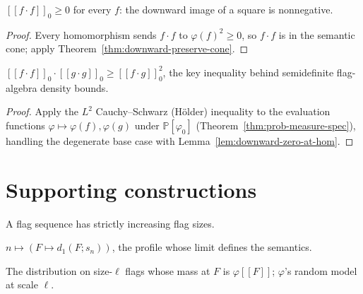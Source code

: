 \begin{theorem}
  \label{thm:square-downward-nonneg}
  \leanok
  $[\![f\cdot f]\!]_0 \ge 0$ for every $f$: the downward image of a square is
  nonnegative.
\end{theorem}
\begin{proof}\leanok
  Every homomorphism sends $f\cdot f$ to $\varphi(f)^2 \ge 0$, so $f\cdot f$ is in
  the semantic cone; apply Theorem~\ref{thm:downward-preserve-cone}.
\end{proof}

\begin{theorem}
  \label{thm:cauchy-schwarz}
  \leanok
  $[\![f\cdot f]\!]_0 \cdot [\![g\cdot g]\!]_0 \ge [\![f\cdot g]\!]_0^2$, the key
  inequality behind semidefinite flag-algebra density bounds.
\end{theorem}
\begin{proof}\leanok
  Apply the $L^2$ Cauchy--Schwarz (Hölder) inequality to the evaluation functions
  $\varphi \mapsto \varphi(f), \varphi(g)$ under $\mathbb{P}[\varphi_0]$
  (Theorem~\ref{thm:prob-measure-spec}), handling the degenerate base case with
  Lemma~\ref{lem:downward-zero-at-hom}.
\end{proof}

\section{Supporting constructions}

\begin{definition}
  \label{def:increases}
  \leanok
  A flag sequence has strictly increasing flag sizes.
\end{definition}

\begin{definition}
  \label{def:flag-density-seq}
  \leanok
  $n \mapsto (F \mapsto d_1(F; s_n))$, the profile whose limit defines the
  semantics.
\end{definition}

\begin{definition}
  \label{def:positivehom-topmf}
  \leanok
  The distribution on size-$\ell$ flags whose mass at $F$ is $\varphi[\![F]\!]$;
  $\varphi$'s random model at scale $\ell$.
\end{definition}

